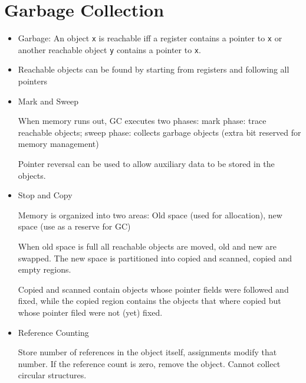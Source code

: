 \section*{Garbage Collection}
\begin{itemize}
	\item Garbage: An object \texttt{x} is reachable iff a register contains a pointer to \texttt{x} or another reachable object \texttt{y} contains a pointer to \texttt{x}.
	
	\item Reachable objects can be found by starting from registers and following all pointers

	\item Mark and Sweep
	
	When memory runs out, GC executes two phases: mark phase: trace reachable objects; sweep phase: collects garbage objects (extra bit reserved for memory management)
	
	Pointer reversal can be used to allow auxiliary data to be stored in the objects.
	
	\item Stop and Copy
	
	Memory is organized into two areas: Old space (used for allocation), new space (use as a reserve for GC)
	
	When old space is full all reachable objects are moved, old and new are swapped. The new space is partitioned into copied and scanned, copied and empty regions.
	
	Copied and scanned contain objects whose pointer fields were followed and fixed, while the copied region contains the objects that where copied but whose pointer filed were not (yet) fixed.
	
	\item Reference Counting
	
	Store number of references in the object itself, assignments modify that number. If the reference count is zero, remove the object. Cannot collect circular structures.
	
\end{itemize}